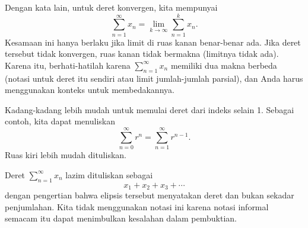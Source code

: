 Dengan kata lain, untuk deret konvergen, kita mempunyai
\begin{equation*}
\sum_{n=1}^\infty x_n
=
\lim_{k\to\infty} 
\sum_{n=1}^k x_n .
\end{equation*}
Kesamaan ini hanya berlaku jika limit di ruas
kanan benar-benar ada.  Jika deret tersebut tidak konvergen, ruas kanan
tidak bermakna (limitnya tidak ada).
Karena itu, berhati-hatilah karena 
$\sum_{n=1}^\infty x_n$ memiliki dua makna berbeda (notasi untuk deret itu sendiri 
atau limit jumlah-jumlah parsial), dan Anda harus menggunakan konteks
untuk membedakannya.

\begin{remark}
Kadang-kadang lebih mudah untuk memulai
deret dari indeks selain 1.  Sebagai contoh, kita dapat menuliskan
\begin{equation*}
\sum_{n=0}^\infty r^n = \sum_{n=1}^\infty r^{n-1} .
\end{equation*}
Ruas kiri lebih mudah dituliskan.
\end{remark}

\begin{remark}
Deret $\sum_{n=1}^\infty x_n$ lazim dituliskan sebagai
\begin{equation*}
x_1 + x_2 + x_3 + \cdots
\end{equation*}
dengan pengertian bahwa elipsis tersebut menyatakan deret dan
bukan sekadar penjumlahan.  Kita tidak menggunakan notasi ini karena notasi informal
semacam itu dapat menimbulkan kesalahan dalam pembuktian.
\end{remark}

